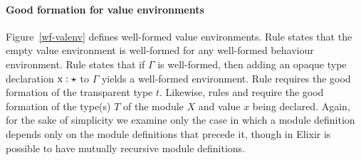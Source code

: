 \documentclass[a4paper,10pt]{article}
\begin{document}
\paragraph{Good formation for value environments} 
Figure~\ref{wf-valenv} defines well-formed value environments. Rule  states that the empty value environment is well-formed for any well-formed behaviour environment. Rule  states that if $\Gamma$ is well-formed, then adding an opaque type declaration $\text{\rm x}:\star$ to $\Gamma$ yields a well-formed environment. Rule  requires the good formation of the transparent type $t$. Likewise, rules  and  require the good formation of the type(s) $T$ of the module $X$ and value $x$ being declared. Again, for the sake of simplicity we examine only the case in which a module definition depends only on the module definitions that precede it, though in Elixir is possible to have mutually recursive module definitions. 



\end{document}
